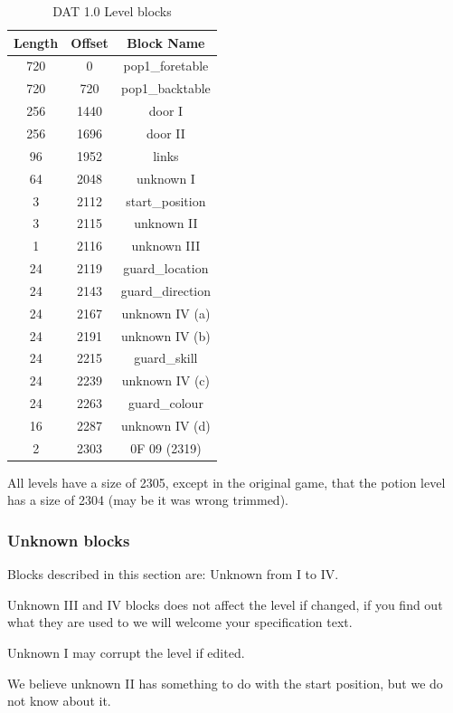 \documentclass{article}
\begin{document}
\begin{table}
\begin{tabular}{ccc}
\hline
  Length& Offset & Block Name \\
\hline
  720   & 0      & pop1\_foretable \\
  720   & 720    & pop1\_backtable \\
\index{foretable}
\index{backtable}
  256   & 1440   & door I \\
  256   & 1696   & door II \\
  96    & 1952   & links \\
  64    & 2048   & unknown I \\
  3     & 2112   & start\_position \\
  3     & 2115   & unknown II \\
  1     & 2116   & unknown III \\
  24    & 2119   & guard\_location \\
  24    & 2143   & guard\_direction \\
  24    & 2167   & unknown IV (a) \\
  24    & 2191   & unknown IV (b) \\
  24    & 2215   & guard\_skill \\
  24    & 2239   & unknown IV (c) \\
  24    & 2263   & guard\_colour \\
  16    & 2287   & unknown IV (d) \\
  2     & 2303   & 0F 09 (2319) \\
\hline
\end{tabular}
\caption{DAT 1.0 Level blocks}
\label{dat1 level}
\end{table}

 All levels have a size of 2305, except in the original game, that the
 potion level has a size of 2304 (may be it was wrong trimmed).

\subsubsection{Unknown blocks} %
 Blocks described in this section are: Unknown from I to IV.

 Unknown III and IV blocks does not affect the level if changed, if you
 find out what they are used to we will welcome your specification text.

 Unknown I may corrupt the level if edited.

 We believe unknown II has something to do with the start position, but we
 do not know about it.
\end{document}
